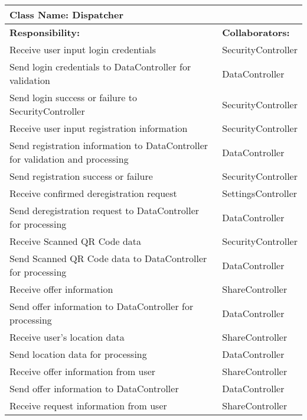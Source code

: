 \documentclass[english]{article}
\begin{document}
    \begin{table}[!ht]
        \centering
        \begin{tabular}{|p{8cm}|p{4cm}|}
        \hline 
        \multicolumn{2}{|l|}{\textbf{Class Name: Dispatcher}} \\
        \hline
        \textbf{Responsibility:} & \textbf{Collaborators:} \\
        \hline
        Receive user input login credentials & SecurityController \\
        \hline
        Send login credentials to DataController for validation & DataController \\
        \hline
        Send login success or failure to SecurityController & SecurityController \\
        \hline
        Receive user input registration information & SecurityController \\
        \hline
        Send registration information to DataController for validation and processing & DataController \\
        \hline
        Send registration success or failure & SecurityController \\
        \hline
        Receive confirmed deregistration request & SettingsController \\
        \hline
        Send deregistration request to DataController for processing & DataController\\
        \hline
        Receive Scanned QR Code data & SecurityController \\
        \hline
        Send Scanned QR Code data to DataController for processing & DataController \\
        \hline
        Receive offer information & ShareController \\
        \hline
        Send offer information to DataController for processing & DataController \\
        \hline
        Receive user's location data  & ShareController \\
        \hline
        Send location data for processing & DataController \\
        \hline
        Receive offer information from user & ShareController \\
        \hline
        Send offer information to DataController & DataController \\
        \hline
        Receive request information from user & ShareController \\
        \hline

\end{tabular}
\end{table}
\end{document}
